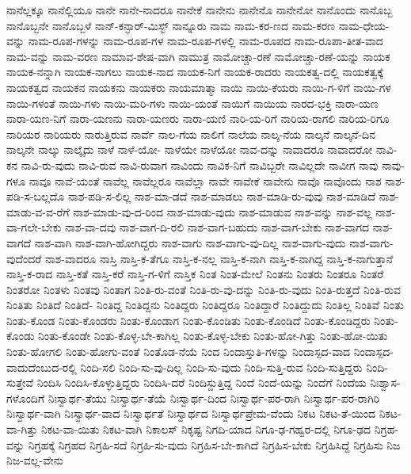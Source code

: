 {ನಾನೆಲ್ಲಕ್ಕೂ
ನಾನೆಲ್ಲಿಯೂ
ನಾನೇ
ನಾನೇ-ನಾದರೂ
ನಾನೇಕೆ
ನಾನೇನು
ನಾನೇನೊ
ನಾನೇನೋ
ನಾನೊಂದು
ನಾನೊಬ್ಬ
ನಾನೊಬ್ಬನೇ
ನಾನೊಬ್ಬಳೆ
ನಾನ್-ಕನ್ಫಾರ್-ಮಿಸ್ಟ್
ನಾನ್ನೂರು
ನಾಮ
ನಾಮ-ಕರ-ಣದ
ನಾಮ-ಕರಣ
ನಾಮ-ಧೇಯ-ವನ್ನು
ನಾಮ-ರೂಪ-ಗಳನ್ನು
ನಾಮ-ರೂಪ-ಗಳ
ನಾಮ-ರೂಪ-ಗಳಲ್ಲಿ
ನಾಮ-ರೂಪದ
ನಾಮ-ರೂಪಾ-ತೀತ-ವಾದ
ನಾಮ-ವನ್ನು
ನಾಮ-ವರಣ
ನಾಮಾವ-ಶೇಷ-ವಾಗಿ
ನಾಮುತ್ರ
ನಾಮೋಚ್ಚಾ-ರಣೆ
ನಾಮೋಚ್ಚಾ-ರಣೆ-ಯನ್ನು
ನಾಯಕ
ನಾಯಕ-ನನ್ನಾಗಿ
ನಾಯಕ-ನಾಗಲು
ನಾಯಕ-ನಾದ
ನಾಯಕ-ನಿಗೆ
ನಾಯಕ-ರಾದರು
ನಾಯಕತ್ವ-ದಲ್ಲಿ
ನಾಯಕತ್ವಕ್ಕೆ
ನಾಯಕತ್ವದ
ನಾಯಕನ
ನಾಯಕನು
ನಾಯಕರು
ನಾಯಮಾತ್ಮಾ
ನಾಯಿ
ನಾಯಿ-ಕೆಯರು
ನಾಯಿ-ಗ-ಳಿಗೆ
ನಾಯಿ-ಗಳ
ನಾಯಿ-ಗಳಂತೆ
ನಾಯಿ-ಗಳು
ನಾಯಿ-ಮರಿ-ಗಳು
ನಾಯಿ-ಯಂತೆ
ನಾಯಿಗೆ
ನಾಯಿಯ
ನಾರದ-ಭಕ್ತಿ
ನಾರಾ-ಯಣ
ನಾರಾ-ಯಣ-ನಿಗೆ
ನಾರಾ-ಯಣನು
ನಾರಾ-ಯಣರು
ನಾರಾ-ಯಣಿ
ನಾರಿ-ಯ-ರಿಗೆ
ನಾರಿಯ-ರಾಗಲಿ
ನಾರಿಯ-ರಿಗೂ
ನಾರಿಯರ
ನಾರಿಯರು
ನಾರುತ್ತಿರುವ
ನಾರ್ವೆ
ನಾಲ-ಗೆಯ
ನಾಲಿಗೆ
ನಾಲೆಯ
ನಾಲ್ಕ-ನೆಯ
ನಾಲ್ಕನೆ
ನಾಲ್ಕನೆ-ದಿನ
ನಾಲ್ಕನೇ
ನಾಲ್ಕು
ನಾಲ್ಕೈದು
ನಾಳೆ
ನಾಳೆ-ಯೋ-
ನಾಳೆಯೇ
ನಾಳೆಯೋ
ನಾವ-ದನ್ನು
ನಾವಾದರೂ
ನಾವಾದರೋ
ನಾವಿ-ಕನ
ನಾವಿ-ರು-ವುದು
ನಾವಿ-ರುವ
ನಾವಿ-ರುವಾಗ
ನಾವಿಂದು
ನಾವಿಕ-ನಿಗೆ
ನಾವಿಬ್ಬರೇ
ನಾವಿಲ್ಲದೇ
ನಾವೀಗ
ನಾವು
ನಾವು-ಗಳೂ
ನಾವೂ
ನಾವೆ-ಯಂತೆ
ನಾವೆಲ್ಲ
ನಾವೆಲ್ಲರೂ
ನಾವೆಲ್ಲಾ
ನಾವೇ
ನಾವೇಕೆ
ನಾವೇನು
ನಾವೊ
ನಾವೊಂದು
ನಾಶ
ನಾಶ-ಪಡಿ-ಸ-ಬಲ್ಲದೊ
ನಾಶ-ಪಡಿ-ಸ-ಲಿಲ್ಲ
ನಾಶ-ಮಾ-ಡದೆ
ನಾಶ-ಮಾಡಲು
ನಾಶ-ಮಾಡಿ-ರು-ವುವು
ನಾಶ-ಮಾಡಿದೆ
ನಾಶ-ಮಾಡು-ವ-ವ-ರೆಗೆ
ನಾಶ-ಮಾಡು-ವು-ದ-ರಿಂದ
ನಾಶ-ಮಾಡು-ವುದು
ನಾಶ-ಮಾಡುವ
ನಾಶ-ವನ್ನು
ನಾಶ-ವಲ್ಲ
ನಾಶ-ವಾ-ಗಲೇ-ಬೇಕು
ನಾಶ-ವಾ-ದವು
ನಾಶ-ವಾಗ-ದಿ-ರಲಿ
ನಾಶ-ವಾಗ-ಬಹುದು
ನಾಶ-ವಾಗ-ಬೇಕು
ನಾಶ-ವಾಗದ
ನಾಶ-ವಾಗದೆ
ನಾಶ-ವಾಗಿ
ನಾಶ-ವಾಗಿ-ಹೋಗಿದ್ದರು
ನಾಶ-ವಾಗು
ನಾಶ-ವಾಗು-ವು-ದಿಲ್ಲ
ನಾಶ-ವಾಗು-ವುದು
ನಾಶ-ವಾಗು-ವುದೆಂದರೆ
ನಾಶ-ವಾದರೂ
ನಾಸ್ತಿ
ನಾಸ್ತಿ-ಕ-ತೆಗೂ
ನಾಸ್ತಿ-ಕ-ನಲ್ಲ
ನಾಸ್ತಿ-ಕ-ನಾಗಿ
ನಾಸ್ತಿ-ಕ-ನಾಗಿದ್ದ
ನಾಸ್ತಿ-ಕ-ನಾಗುತ್ತಾನೆ
ನಾಸ್ತಿ-ಕ-ರಾದ
ನಾಸ್ತಿ-ಕತೆ
ನಾಸ್ತಿ-ಕರೆ
ನಾಸ್ತಿ-ಗ-ಳಿಗೆ
ನಾಸ್ತಿಕ
ನಿಂತ
ನಿಂತ-ಮೇಲೆ
ನಿಂತನು
ನಿಂತರು
ನಿಂತರೂ
ನಿಂತರೆ
ನಿಂತರೋ
ನಿಂತಳು
ನಿಂತವು
ನಿಂತಾಗ
ನಿಂತಿ-ರು-ವಂತೆ
ನಿಂತಿ-ರು-ವು-ದನ್ನು
ನಿಂತಿ-ರು-ವುದು
ನಿಂತಿ-ರುತ್ತದೆ
ನಿಂತಿ-ರುವ
ನಿಂತಿತು
ನಿಂತಿದೆ
ನಿಂತಿದೆ-
ನಿಂತಿದ್ದ
ನಿಂತಿದ್ದನು
ನಿಂತಿದ್ದರು
ನಿಂತಿದ್ದರೂ
ನಿಂತಿದ್ದಾರೆ
ನಿಂತಿದ್ದುದು
ನಿಂತಿಲ್ಲ
ನಿಂತಿವೆ
ನಿಂತು
ನಿಂತು-ಕೊಂಡ
ನಿಂತು-ಕೊಂಡರು
ನಿಂತು-ಕೊಂಡಾಗ
ನಿಂತು-ಕೊಂಡಿತು
ನಿಂತು-ಕೊಂಡಿದೆ
ನಿಂತು-ಕೊಂಡಿದ್ದರು
ನಿಂತು-ಕೊಂಡು
ನಿಂತು-ಕೊಂಡೇ
ನಿಂತು-ಕೊಳ್ಳ-ಬೇ-ಕಾಗಿಲ್ಲ
ನಿಂತು-ಕೊಳ್ಳ-ಬೇಕು
ನಿಂತು-ಹೋ-ಗಿತ್ತು
ನಿಂತು-ಹೋ-ಯಿತು
ನಿಂತು-ಹೋಗಲಿ
ನಿಂತು-ಹೋಗು-ವಂತೆ
ನಿಂತೊಡ-ನೆಯೆ
ನಿಂದ
ನಿಂದಾಸ್ತುತಿ-ಗಳನ್ನು
ನಿಂದಾಸ್ಪದ-ವಾದ
ನಿಂದಾಸ್ಪದ-ವಾದುದೆಂಬುದ-ರಲ್ಲಿ
ನಿಂದಿ-ಸಲಿ
ನಿಂದಿ-ಸು-ವು-ದಿಲ್ಲ
ನಿಂದಿ-ಸು-ವುದು
ನಿಂದಿ-ಸುತ್ತಿ-ರುವ
ನಿಂದಿ-ಸುತ್ತಿದ್ದರು
ನಿಂದಿ-ಸುತ್ತೇವೆ
ನಿಂದಿಸಿ
ನಿಂದಿಸಿ-ಕೊಳ್ಳುತ್ತಿದ್ದರು
ನಿಂದಿಸಿ-ದರೆ
ನಿಂದಿಸ್ದುತ್ತಿದ್ದ
ನಿಂದೆ
ನಿಂದೆ-ಯನ್ನು
ನಿಂದೆಗೆ
ನಿಂದೆಯ
ನಿಃಶ್ವಾಸ-ಗಳೊಂದಿಗೆ
ನಿಃಸ್ವಾರ್ಥ-ತೆಯು
ನಿಃಸ್ವಾರ್ಥ-ತೆಯೆ
ನಿಃಸ್ವಾರ್ಥ-ದಿಂದ
ನಿಃಸ್ವಾರ್ಥ-ಪರ-ರಾಗಿ
ನಿಃಸ್ವಾರ್ಥ-ಪರ-ರಾಗಿರಿ
ನಿಃಸ್ವಾರ್ಥ-ವಾಗಿ
ನಿಃಸ್ವಾರ್ಥ-ವಾದ
ನಿಃಸ್ವಾರ್ಥತೆ
ನಿಃಸ್ವಾರ್ಥದ
ನಿಃಸ್ವಾರ್ಥಪ್ರೇಮ-ವೆಂದು
ನಿಕಟ
ನಿಕಟ-ತೆ-ಯಿಂದ
ನಿಕಟ-ವಾ-ಗಿತ್ತು
ನಿಕಟ-ವಾ-ಯಿತು
ನಿಕಟ-ವಾಗಿ
ನಿಕಾಲಸ್
ನಿಕೃಷ್ಟ
ನಿಗದಿ-ಯಾದ
ನಿಗೂ-ಢ-ಗಹ್ವರ-ದಲ್ಲಿ
ನಿಗೂ-ಢದ
ನಿಗ್ರಹ-ವನ್ನು
ನಿಗ್ರಹಕ್ಕೆ
ನಿಗ್ರಹದ
ನಿಗ್ರಹಿ-ಸದೆ
ನಿಗ್ರಹಿ-ಸು-ವುದು
ನಿಗ್ರಹಿಸ-ಬೇ-ಕಾಗಿದೆ
ನಿಗ್ರಹಿಸ-ಬೇಕು
ನಿಗ್ರಹಿಸಿದ್ದೆ
ನಿಗ್ರಹಿಸು
ನಿಜ
ನಿಜ-ವಲ್ಲ-ವೇನು
}
